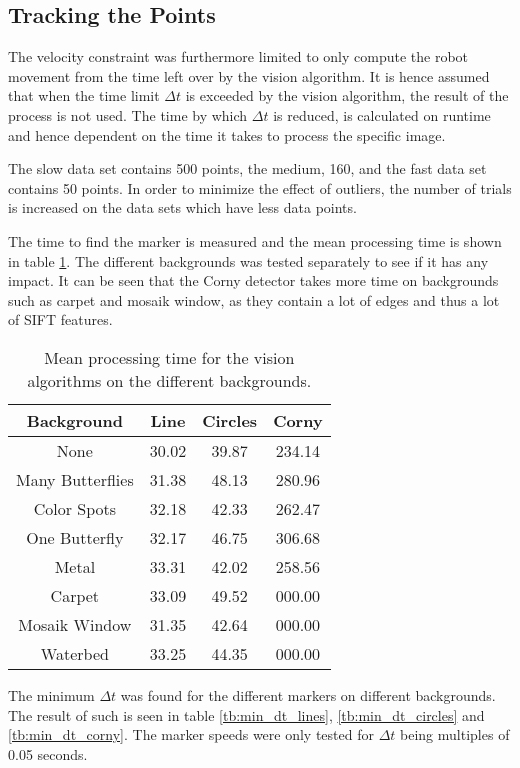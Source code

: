 \subsection{Tracking the Points}
The velocity constraint was furthermore limited to only compute the robot movement from the time left over by the vision algorithm.
It is hence assumed that when the time limit $\Delta t$ is exceeded by the vision algorithm, the result of the process is not used.
The time by which $\Delta t$ is reduced, is calculated on runtime and hence dependent on the time it takes to process the specific image.

The slow data set contains 500 points, the medium, 160, and the fast data set contains 50 points.
In order to minimize the effect of outliers, the number of trials is increased on the data sets which have less data points.

The time to find the marker is measured and the mean processing time is shown in table \ref{tb:mean_processing_time}.
The different backgrounds was tested separately to see if it has any impact.
It can be seen that the Corny detector takes more time on backgrounds such as carpet and mosaik window, as they contain a lot of edges and thus a lot of SIFT features.

\begin{table}[H]
\center
\begin{tabular}{|c|c|c|c|}
\hline
Background       & Line      & Circles   & Corny     \\ \hline
None             & 30.02 & 39.87 & 234.14 \\ \hline
Many Butterflies & 31.38 & 48.13 & 280.96 \\ \hline
Color Spots      & 32.18 & 42.33 & 262.47 \\ \hline
One Butterfly    & 32.17 & 46.75 & 306.68 \\ \hline
Metal            & 33.31 & 42.02 & 258.56 \\ \hline
Carpet           & 33.09 & 49.52 & 000.00 \\ \hline
Mosaik Window    & 31.35 & 42.64 & 000.00 \\ \hline
Waterbed         & 33.25 & 44.35 & 000.00 \\ \hline
\end{tabular}
\caption{Mean processing time for the vision algorithms on the different backgrounds.}
\label{tb:mean_processing_time}
\end{table}

The minimum $\Delta t$ was found for the different markers on different backgrounds.
The result of such is seen in table \ref{tb:min_dt_lines}, \ref{tb:min_dt_circles}
 and \ref{tb:min_dt_corny}.
The marker speeds were only tested for $\Delta t$ being multiples of 0.05 seconds.

